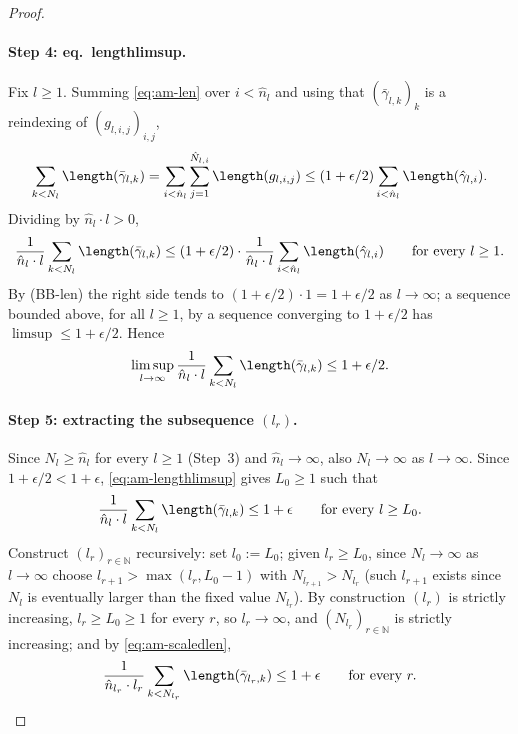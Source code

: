 \begin{proof}
  \paragraph{Step 4: eq.~lengthlimsup.} Fix $l\ge1$. Summing \eqref{eq:am-len} over $i<\hat n_l$
  and using that $(\bar\gamma_{l,k})_k$ is a reindexing of $(g_{l,i,j})_{i,j}$,
  \[
    \sum_{k<N_l}\length(\bar\gamma_{l,k}) = \sum_{i<\hat n_l}\sum_{j=1}^{\hat N_{l,i}}
      \length(g_{l,i,j}) \le (1+\epsilon/2)\sum_{i<\hat n_l}\length(\hat\gamma_{l,i})
    .
  \]
  Dividing by $\hat n_l\cdot l>0$,
  \[
    \frac1{\hat n_l\cdot l}\sum_{k<N_l}\length(\bar\gamma_{l,k})
    \le (1+\epsilon/2)\cdot\frac1{\hat n_l\cdot l}\sum_{i<\hat n_l}\length(\hat\gamma_{l,i})
    \qquad\text{for every }l\ge1
    .
  \]
  By (BB-len) the right side tends to $(1+\epsilon/2)\cdot1=1+\epsilon/2$ as $l\to\infty$; a
  sequence bounded above, for all $l\ge1$, by a sequence converging to $1+\epsilon/2$ has
  $\limsup\le1+\epsilon/2$. Hence
  \begin{equation}
    \label{eq:am-lengthlimsup}
    \limsup_{l\to\infty}\frac1{\hat n_l\cdot l}\sum_{k<N_l}\length(\bar\gamma_{l,k})
    \le 1+\epsilon/2
    .
  \end{equation}

  \paragraph{Step 5: extracting the subsequence $(l_r)$.} Since $N_l\ge\hat n_l$ for every $l\ge1$
  (Step~3) and $\hat n_l\to\infty$, also $N_l\to\infty$ as $l\to\infty$. Since $1+\epsilon/2<1+
  \epsilon$, \eqref{eq:am-lengthlimsup} gives $L_0\ge1$ such that
  \begin{equation}
    \label{eq:am-scaledlen}
    \frac1{\hat n_l\cdot l}\sum_{k<N_l}\length(\bar\gamma_{l,k}) \le 1+\epsilon
    \qquad\text{for every }l\ge L_0
    .
  \end{equation}
  Construct $(l_r)_{r\in\mathbb N}$ recursively: set $l_0:=L_0$; given $l_r\ge L_0$, since
  $N_l\to\infty$ as $l\to\infty$ choose $l_{r+1}>\max(l_r,L_0-1)$ with $N_{l_{r+1}}>N_{l_r}$ (such
  $l_{r+1}$ exists since $N_l$ is eventually larger than the fixed value $N_{l_r}$). By
  construction $(l_r)$ is strictly increasing, $l_r\ge L_0\ge1$ for every $r$, so $l_r\to\infty$,
  and $(N_{l_r})_{r\in\mathbb N}$ is strictly increasing; and by \eqref{eq:am-scaledlen},
  \begin{equation}
    \label{eq:am-scaledlen-r}
    \frac1{\hat n_{l_r}\cdot l_r}\sum_{k<N_{l_r}}\length(\bar\gamma_{l_r,k}) \le 1+\epsilon
    \qquad\text{for every }r
    .
  \end{equation}


\end{proof}
